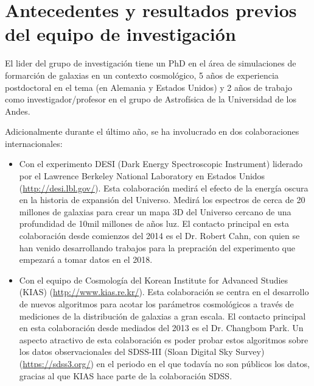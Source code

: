 \section{Antecedentes y resultados previos del equipo de
  investigaci\'on} 

El lider del grupo de investigaci\'on tiene un PhD en el \'area de simulaciones
de formarci\'on de galaxias en un  contexto cosmol\'ogico, 5 a\~nos
de experiencia postdoctoral en el tema (en Alemania y Estados Unidos)
y 2 a\~nos de trabajo como investigador/profesor en el grupo de
Astrof\'isica de la Universidad de los Andes.


Adicionalmente durante el \'ultimo a\~no, se ha involucrado en dos
colaboraciones internacionales: 

\begin{itemize}
\item Con el experimento DESI
(Dark Energy Spectroscopic Instrument) liderado por el Lawrence
Berkeley National Laboratory en Estados Unidos
(\url{http://desi.lbl.gov/}). Esta colaboraci\'on medir\'a el efecto
de la energ\'ia oscura en la historia de expansi\'on del
Universo. Medir\'a los espectros de cerca de 20 millones de galaxias
para crear un mapa 3D del Universo cercano de una profundidad de 10mil
millones de a\~nos luz. El contacto principal en esta colaboraci\'on
desde comienzos del 2014
es el Dr. Robert Cahn, con quien se han venido desarrollando trabajos
para la prepraci\'on del experimento que empezar\'a a tomar datos en
el 2018.

\item Con el equipo de Cosmolog\'ia del Korean Institute for Advanced
  Studies (KIAS) (\url{http://www.kias.re.kr/}). Esta colaboraci\'on
  se centra en el desarrollo de nuevos 
  algoritmos para acotar los par\'ametros cosmol\'ogicos a trav\'es de
  mediciones de la distribuci\'on de galaxias a gran escala. El
  contacto principal en esta colaboraci\'on desde mediados del 2013 es
  el Dr. Changbom Park. Un aspecto atractivo de esta colaboraci\'on es
  poder probar estos algoritmos sobre los datos observacionales del
  SDSS-III (Sloan Digital  Sky Survey) (\url{https://sdss3.org/}) en
  el periodo en el que todav\'ia no son p\'ublicos los  datos, gracias
  al que KIAS hace parte de la colaboraci\'on SDSS. 

\end{itemize}

